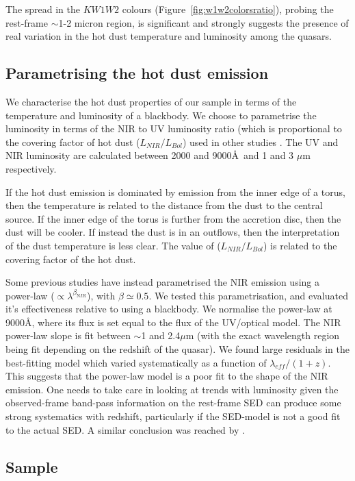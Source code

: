 The spread in the $KW1W2$ colours (Figure~\ref{fig:w1w2colorsratio}), probing the rest-frame $\sim$1-2 micron region, is significant and strongly suggests the presence of real variation in the hot dust temperature and luminosity among the quasars. 

\subsection{Parametrising the hot dust emission}

We characterise the hot dust properties of our sample in terms of the temperature and luminosity of a blackbody.  
We choose to parametrise the luminosity in terms of the NIR to UV luminosity ratio (which is proportional to the covering factor of hot dust ($L_{NIR}/L_{Bol}$) used in other studies \citep{roseboom13}. 
The UV and NIR luminosity are calculated between 2000 and 9000\AA\, and 1 and 3 $\mu$m respectively.

If the hot dust emission is dominated by emission from the inner edge of a torus, then the temperature is related to the distance from the dust to the central source. 
If the inner edge of the torus is further from the accretion disc, then the dust will be cooler.
If instead the dust is in an outflows, then the interpretation of the dust temperature is less clear.  
The value of ($L_{NIR}/L_{Bol}$) is related to the covering factor of the hot dust. 

Some previous studies \citep[e.g.][]{wang13,zhang14} have instead parametrised the NIR emission using a power-law ($\propto \lambda^{\beta_{\mathrm NIR}}$), with $\beta \simeq 0.5$. 
We tested this parametrisation, and evaluated it's effectiveness relative to using a blackbody. 
We normalise the power-law at 9000\AA, where its flux is set equal to the flux of the UV/optical model. 
The NIR power-law slope is fit between $\sim$1 and 2.4$\mu$m (with the exact wavelength region being fit depending on the redshift of the quasar). 
We found large residuals in the best-fitting model which varied systematically as a function of $\lambda_{eff}/(1+z)$.  
This suggests that the power-law model is a poor fit to the shape of the NIR emission. 
One needs to take care in looking at trends with luminosity given the observed-frame band-pass information on the rest-frame SED can produce some strong systematics with redshift, particularly if the SED-model is not a good fit to the actual SED. 
A similar conclusion was reached by \citet{gallagher07}.

\subsection{Sample}

